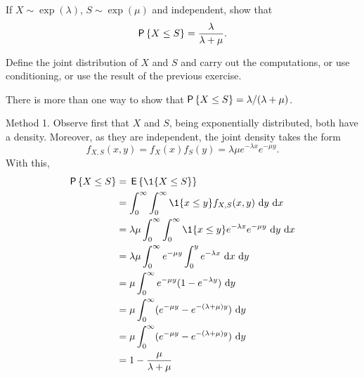 \begin{exercise}\label{ex:3}
   If $X\sim \exp(\lambda)$, $S\sim\exp(\mu)$ and independent, show that 
    \begin{equation*}
      \P{X\leq S} = \frac{\lambda}{\lambda+\mu}.
    \end{equation*}
    \begin{hint}
     Define the joint distribution of $X$ and $S$ and carry out
      the computations, or use conditioning, or use the result of the
      previous exercise.
    \end{hint}
\begin{solution}
There is more than one way to show that $\P{X\leq S} = \lambda/(\lambda+\mu)$.  

Method 1. 
Observe first that $X$ and $S$, being
exponentially distributed, both have a density. Moreover, as they are
independent,  the joint density takes the form
\begin{equation*}
f_{X,S}(x,y) = f_X(x)f_S(y) = \lambda \mu e^{-\lambda x} e^{-\mu
  y}.
\end{equation*}
With this,
\begin{equation*}
  \begin{split}
    \P{X\leq S} 
&= \E{\1{X\leq S}} \\
&= \int_0^\infty \int_0^\infty \1{x\leq y} f_{X,S}(x,y)\, \d y\,\d x\\
&= \lambda \mu \int_0^\infty \int_0^\infty \1{x\leq y} e^{-\lambda x} e^{-\mu y} \, \d y\,\d x\\
&= \lambda \mu \int_0^\infty e^{-\mu y} \int_0^y e^{-\lambda x}\, \d x \, \d y \\
&= \mu \int_0^\infty e^{-\mu y} (1-e^{-\lambda y})\,\d y\\
&= \mu \int_0^\infty (e^{-\mu y} - e^{-(\lambda +\mu)y} ) \,\d y\\
&= \mu \int_0^\infty (e^{-\mu y} - e^{-(\lambda +\mu)y} ) \,\d y\\
&= 1 - \frac{\mu}{\lambda + \mu} 
  \end{split}
\end{equation*}


\end{solution}
\end{exercise}
